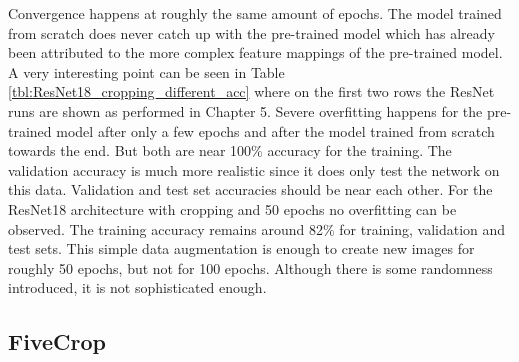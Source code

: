 Convergence happens at roughly the same amount of epochs. The model trained from scratch does never catch up with the pre-trained model which has already been attributed to the more complex feature mappings of the pre-trained model. A very interesting point can be seen in Table \ref{tbl:ResNet18_cropping_different_acc} where on the first two rows the ResNet runs are shown as performed in Chapter 5. Severe overfitting happens for the pre-trained model after only a few epochs and after the model trained from scratch towards the end. But both are near 100\% accuracy for the training. The validation accuracy is much more realistic since it does only test the network on this data. Validation and test set accuracies should be near each other. For the ResNet18 architecture with cropping and 50 epochs no overfitting can be observed. The training accuracy remains around 82\% for training, validation and test sets. This simple data augmentation is enough to create new images for roughly 50 epochs, but not for 100 epochs. Although there is some randomness introduced, it is not sophisticated enough.

\begin{table}[!h] \centering
{}
\caption{Different set accuracies. If the training accuracy is much higher than the validation or test accuracy, then there is a problem with overfitting to the training data.}
\label{tbl:ResNet18_cropping_different_acc}
\end{table}

\subsection{FiveCrop}

